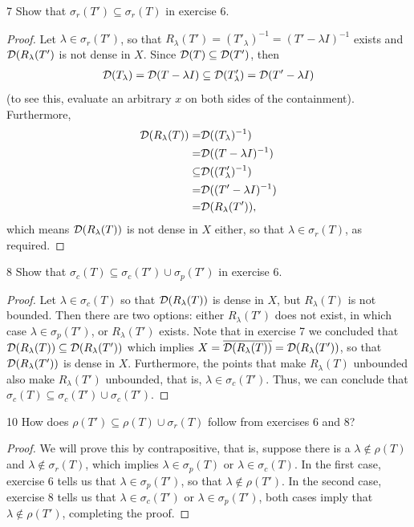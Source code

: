 \begin{exercise}{7}
Show that $\sigma_r(T') \subseteq \sigma_r(T)$ in exercise 6.
\end{exercise}
\begin{proof}
Let $\lambda \in \sigma_r(T')$, so that $R_\lambda(T') = (T'_\lambda)^{-1} =(T' - \lambda I)^{-1}$ exists and $\mathcal{D}(R_\lambda(T')$ is not dense in $X$.
Since $\mathcal{D}(T) \subseteq \mathcal{D}(T')$, then 
\begin{align*}
    \mathcal{D}(T_\lambda) 
    = \mathcal{D}(T - \lambda I) 
    \subseteq \mathcal{D}(T'_\lambda) 
    = \mathcal{D}(T' - \lambda I)
\end{align*}
(to see this, evaluate an arbitrary $x$ on both sides of the containment).
Furthermore,
\begin{align*}
    \mathcal{D}(R_\lambda(T))
    =& \mathcal{D}((T_\lambda)^{-1})\\
    =& \mathcal{D}((T - \lambda I)^{-1})\\
    \subseteq& \mathcal{D}((T'_\lambda)^{-1})\\
    =& \mathcal{D}((T' - \lambda I)^{-1})\\
    =& \mathcal{D}(R_\lambda(T')),
\end{align*}
which means $\mathcal{D}(R_\lambda(T))$ is not dense in $X$ either, so that $\lambda \in \sigma_r(T)$, as required.
\end{proof} 

\begin{exercise}{8}
Show that $\sigma_c(T) \subseteq \sigma_c(T') \cup \sigma_p(T')$ in exercise 6.
\end{exercise}
\begin{proof}
Let $\lambda \in \sigma_c(T)$ so that $\mathcal{D}(R_\lambda(T))$ is dense in $X$, but $R_\lambda(T)$ is not bounded.
Then there are two options:
either $R_\lambda(T')$ does not exist, in which case $\lambda \in \sigma_p(T')$,
or $R_\lambda(T')$ exists.
Note that in exercise 7 we concluded that $\mathcal{D}(R_\lambda(T)) \subseteq \mathcal{D}(R_\lambda(T'))$ which implies $X = \overline{\mathcal{D}(R_\lambda(T))} = \mathcal{D}(R_\lambda(T'))$, so that $\mathcal{D}(R_\lambda(T'))$ is dense in $X$.
Furthermore, the points that make $R_\lambda(T)$ unbounded also make $R_\lambda(T')$ unbounded, that is, $\lambda \in \sigma_c(T')$.
Thus, we can conclude that $\sigma_c(T) \subseteq \sigma_c(T') \cup \sigma_c(T')$.
\end{proof} 

\begin{exercise}{10}
How does $\rho(T') \subseteq \rho(T) \cup \sigma_r(T)$ follow from exercises 6 and 8?
\end{exercise}
\begin{proof}
We will prove this by contrapositive, that is, suppose there is a $\lambda \notin \rho(T)$ and $\lambda \notin \sigma_r(T)$, which implies $\lambda \in \sigma_p(T)$ or $\lambda \in \sigma_c(T)$.
In the first case, exercise 6 tells us that $\lambda \in \sigma_p(T')$, so that $\lambda \notin \rho(T')$.
In the second case, exercise 8 tells us that $\lambda \in \sigma_c(T')$ or $\lambda \in \sigma_p(T')$, both cases imply that $\lambda \notin \rho(T')$, completing the proof.
\end{proof} 
